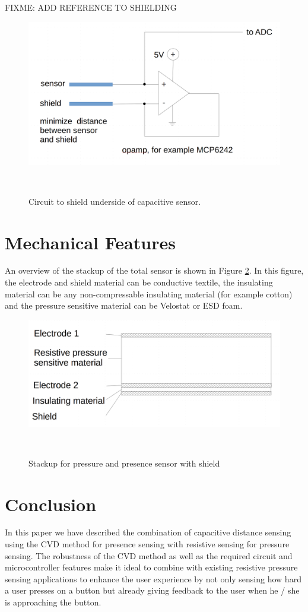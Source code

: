 \documentclass{sigchi}
\begin{document}
FIXME: ADD REFERENCE TO SHIELDING

\begin{figure}[!htbp]
\centering
  \includegraphics[width=0.9\columnwidth]{figures/shield_circuit}
  \caption{Circuit to shield underside of capacitive
sensor.}~\label{fig:shield_circuit}
\end{figure}

\section{Mechanical Features}
An overview of the stackup of the total sensor is shown in Figure
\ref{fig:stackup}. In this figure, the electrode and shield material can be
conductive textile, the insulating material can be any non-compressable
insulating material (for example cotton) and the pressure sensitive material can
be Velostat or ESD foam.

\begin{figure}[!htbp]
\centering
  \includegraphics[width=0.9\columnwidth]{figures/stackup}
  \caption{Stackup for pressure and presence sensor with
shield}~\label{fig:stackup}
\end{figure}


\section{Conclusion}
In this paper we have described the combination of capacitive distance sensing
using the CVD method for presence sensing with resistive sensing for pressure
sensing. The robustness of the CVD method as well as the required circuit and
microcontroller features make it ideal to combine with existing resistive
pressure sensing applications to enhance the user experience by not only sensing
how hard a user presses on a button but already giving feedback to the user when
he / she is approaching the button.

\balance{}



\end{document}
